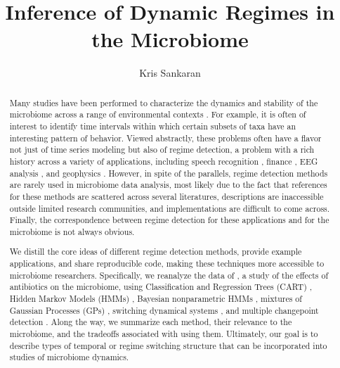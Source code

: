 \documentclass[14pt]{extarticle}
\title{Inference of Dynamic Regimes in the Microbiome}
\author{Kris Sankaran}
\begin{document}
\maketitle

\begin{abstract}
Many studies have been performed to characterize the dynamics and stability of
the microbiome across a range of environmental contexts
\citep{costello2012application, stein2013ecological, faust2015metagenomics}. For
example, it is often of interest to identify time intervals within which certain
subsets of taxa have an interesting pattern of behavior. Viewed abstractly,
these problems often have a flavor not just of time series modeling but also of
regime detection, a problem with a rich history across a variety of
applications, including speech recognition \citep{fox2011sticky}, finance
\citep{lee2009optimal}, EEG analysis \citep{camilleri2014automatic}, and
geophysics \citep{weatherley2002relationship}. However, in spite of the
parallels, regime detection methods are rarely used in microbiome data analysis,
most likely due to the fact that references for these methods are scattered
across several literatures, descriptions are inaccessible outside limited
research communities, and implementations are difficult to come across. Finally,
the correspondence between regime detection for these applications and for the
microbiome is not always obvious.

We distill the core ideas of different regime detection methods, provide example
applications, and share reproducible code, making these techniques more
accessible to microbiome researchers. Specifically, we reanalyze the data of
\cite{dethlefsen2011incomplete}, a study of the effects of antibiotics on the
microbiome, using Classification and Regression Trees (CART)
\citep{breiman1984classification}, Hidden Markov Models (HMMs)
\citep{rabiner1986introduction}, Bayesian nonparametric HMMs
\citep{teh2010hierarchical, fox2008hdp}, mixtures of Gaussian Processes (GPs)
\citep{rasmussen2002infinite}, switching dynamical systems
\citep{linderman2016recurrent}, and multiple changepoint detection
\citep{fan2015empirical}. Along the way, we summarize each method, their
relevance to the microbiome, and the tradeoffs associated with using them.
Ultimately, our goal is to describe types of temporal or regime switching
structure that can be incorporated into studies of microbiome dynamics.
\end{abstract}

\tableofcontents
\end{document}

